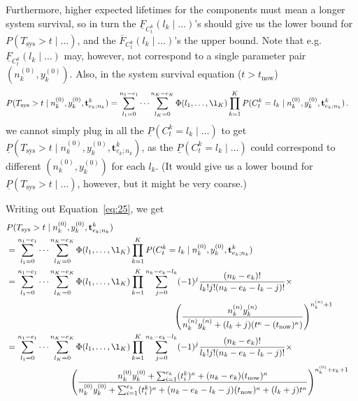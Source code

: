 \documentclass[12pt,a4paper,fleqn]{narms}
\newcommand{\mbf}[1]{\mathbf{#1}}
\newcommand{\uz}{^{(0)}} %
\newcommand{\un}{^{(n)}} %
\newcommand{\ul}[1]{\underline{#1}}
\newcommand{\ol}[1]{\overline{#1}}
\def\Tsys{T_\text{sys}}
\def\ykz{y\uz_k}
\def\ykn{y\un_k}
\def\nkz{n\uz_k}
\def\nkn{n\un_k}
\def\tnow{t_\text{now}}
\begin{document}
Furthermore, higher expected lifetimes for the components must mean
a longer system survival, so in turn the $\ul{F}_{C^k_t}(l_k \mid \ldots)$'s
should give us the lower bound for $P(\Tsys > t\mid\ldots)$,
and the $\ol{F}_{C^k_t}(l_k \mid \ldots)$'s the upper bound.
Note that e.g.\ $\ul{F}_{C^k_t}(l_k \mid \ldots)$ may, however, not correspond to a single parameter pair $(\nkz, \ykz)$.
Also, in the system survival equation ($t > \tnow$)
\begin{align} \label{eq:25}
P(\Tsys > t\mid\nkz,\ykz, \mbf{t}^k_{e_k;n_k})
 &= \sum_{l_1=0}^{n_1-e_1} \cdots \sum_{l_K=0}^{n_K-e_K} \Phi(l_1,\ldots,\l_K) \prod_{k=1}^K
    P(C^k_t = l_k\mid\nkz,\ykz, \mbf{t}^k_{e_k;n_k}) \,.
\end{align}
we cannot simply plug in all the $\ul{P}(C^k_t = l_k\mid \ldots)$ %
to get $\ul{P}(\Tsys > t\mid\nkz,\ykz, \mbf{t}^k_{e_k;n_k})$, %
as the $\ul{P}(C^k_t = l_k\mid \ldots)$ could correspond to different $(\nkz,\ykz)$ for each $l_k$.
(It would give us a lower bound for $\ul{P}(\Tsys > t\mid\ldots)$, however, but it might be very coarse.)

Writing out Equation~\eqref{eq:25}, we get
\begin{align}
\lefteqn{P(\Tsys > t\mid\nkz,\ykz, \mbf{t}^k_{e_k;n_k})} \\
 &= \sum_{l_1=0}^{n_1-e_1} \cdots \sum_{l_K=0}^{n_K-e_K} \Phi(l_1,\ldots,\l_K) \prod_{k=1}^K
    P(C^k_t = l_k\mid\nkz,\ykz, \mbf{t}^k_{e_k;n_k}) \\
 &= \sum_{l_1=0}^{n_1-e_1} \cdots \sum_{l_K=0}^{n_K-e_K} \Phi(l_1,\ldots,\l_K) \prod_{k=1}^K
    \sum_{j=0}^{n_k-e_k-l_k} (-1)^j \frac{(n_k - e_k)!}{l_k! j! (n_k - e_k - l_k - j)!} \times \\ & \hspace*{45ex}
    \left(\frac{\nkn\ykn}{\nkn\ykn + (l_k + j) (t^\kappa - (\tnow)^\kappa)}\right)^{\nkn + 1} \\
 &= \sum_{l_1=0}^{n_1-e_1} \cdots \sum_{l_K=0}^{n_K-e_K} \Phi(l_1,\ldots,\l_K) \prod_{k=1}^K \label{eq:30}
    \sum_{j=0}^{n_k-e_k-l_k} (-1)^j \frac{(n_k - e_k)!}{l_k! j! (n_k - e_k - l_k - j)!} \times \\ & \hspace*{17ex}
    \left(\frac{\nkz\ykz + \sum_{i=1}^{e_k} (t_i^k)^\kappa + (n_k-e_k) (\tnow)^\kappa }%
               {\nkz\ykz + \sum_{i=1}^{e_k} (t_i^k)^\kappa + (n_k-e_k-l_k-j) (\tnow)^\kappa + (l_k + j) t^\kappa }\right)^{%
    \nkz + e_k + 1} 
\end{align}
\end{document}
